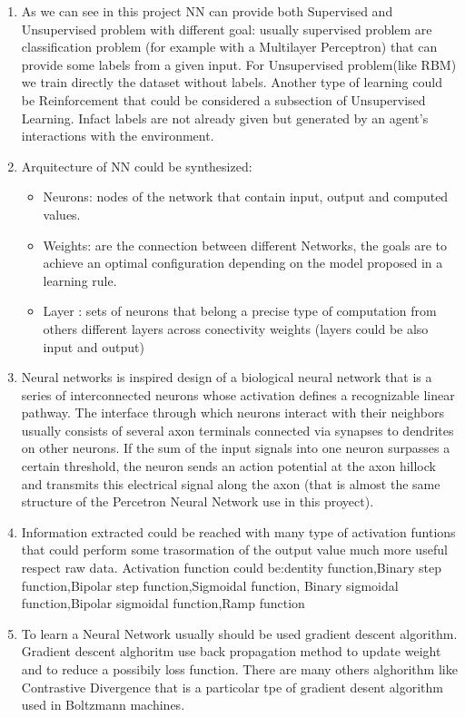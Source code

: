 \documentclass[paper=letter, fontsize=12pt]{article}
\begin{document}
\begin{enumerate}
\item As we can see in this project NN can provide both Supervised and Unsupervised problem with different goal: usually supervised problem are classification problem (for example with a Multilayer Perceptron) that can provide some labels from a given input. For Unsupervised problem(like RBM) we train directly the dataset without labels. Another type of learning could be Reinforcement that could be considered a subsection of Unsupervised Learning. Infact labels are not already given but generated by an agent's interactions with the environment.
\item Arquitecture of NN could be synthesized:
\begin{itemize}
\item Neurons: nodes of the network that contain input, output and computed values.
\item Weights: are the connection between different Networks, the goals are to achieve an optimal configuration depending on the model proposed in a learning rule. 
\item Layer : sets of neurons that belong a precise type of computation from others different layers across conectivity weights (layers could be also input and output)
\end{itemize}
\item Neural networks is inspired design of  a biological neural network that is a series of interconnected neurons whose activation defines a recognizable linear pathway. The interface through which neurons interact with their neighbors usually consists of several axon terminals connected via synapses to dendrites on other neurons. If the sum of the input signals into one neuron surpasses a certain threshold, the neuron sends an action potential  at the axon hillock and transmits this electrical signal along the axon (that is almost the same structure of the Percetron Neural Network use in this proyect).
\item Information extracted could be reached with many type of activation funtions that could perform some trasormation of the output value much more useful respect raw data.
Activation function could be:dentity function,Binary step function,Bipolar step function,Sigmoidal function, Binary sigmoidal function,Bipolar sigmoidal function,Ramp function
\item To learn a Neural Network usually should be used gradient descent algorithm.
Gradient descent alghoritm use back propagation method to update weight and to reduce a possibily loss function. There are many others alghorithm like Contrastive Divergence that is a particolar tpe of gradient desent algorithm used in Boltzmann machines.
\end{enumerate}
\end{document}

